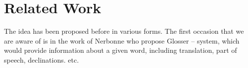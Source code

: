 
\section{Related Work}

The idea has been proposed before in various forms. The first occasion that we are aware of is in the work of Nerbonne \cite{Nerb99-Assistant} who propose Glosser -- system, which would provide information about a given word, including translation, part of speech, declinations. etc. 

